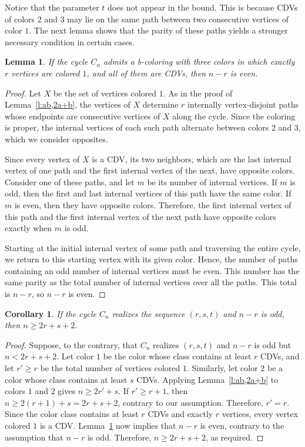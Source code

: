 \documentclass{article}
\newtheorem{corollary}[theorem]{Corollary}
\newtheorem{lemma}[theorem]{Lemma}
\theoremstyle{definition}
\begin{document}
\medskip

Notice that the parameter $t$ does not appear in the bound. This is because CDVs of colors $2$ and $3$ may lie on the same path between two consecutive vertices of color $1$. The next lemma shows that the parity of these paths yields a stronger necessary condition in certain cases.

\begin{lemma}\label{l:n-a,even}
If the cycle $C_n$ admits a b-coloring with three colors in which exactly $r$ vertices are colored $1$, and all of them are CDVs, then $n-r$ is even.
\end{lemma}

\begin{proof}
Let $X$ be the set of vertices colored $1$. As in the proof of Lemma~\ref{l:ab,2a+b}, the vertices of $X$ determine $r$ internally vertex-disjoint paths whose endpoints are consecutive vertices of $X$ along the cycle. Since the coloring is proper, the internal vertices of each such path alternate between colors $2$ and $3$, which we consider opposites.

Since every vertex of $X$ is a CDV, its two neighbors, which are the last internal vertex of one path and the first internal vertex of the next, have opposite colors.
Consider one of these paths, and let $m$ be its number of internal vertices. If $m$ is odd, then the first and last internal vertices of this path have the same color. If $m$ is even, then they have opposite colors.
Therefore, the first internal vertex of this path and the first internal vertex of the next path have opposite colors exactly when $m$ is odd.

Starting at the initial internal vertex of some path and traversing the entire cycle, we return to this starting vertex with its given color. Hence, the number of paths containing an odd number of internal vertices must be even.
This number has the same parity as the total number of internal vertices over all the paths.
This total is $n-r$, so $n-r$ is even.
\end{proof}

\medskip

\begin{corollary}\label{c:n-aodd,2a+b+2}
If the cycle $C_n$ realizes the sequence $(r,s,t)$ and $n-r$ is odd, then $n\ge 2r+s+2$.
\end{corollary}

\begin{proof}
Suppose, to the contrary, that $C_n$ realizes $(r,s,t)$ and $n-r$ is odd but
$n<2r+s+2$. Let color $1$ be the color whose class contains at least $r$ CDVs, and let $r'\geq r$ be the total number of vertices colored $1$. Similarly, let color $2$ be a color whose class contains at least $s$ CDVs. Applying Lemma~\ref{l:ab,2a+b} to colors $1$ and $2$ gives $n\ge 2r'+s$. If $r'\ge r+1$, then $n\ge 2(r+1)+s=2r+s+2$, contrary to our assumption. Therefore, $r'=r$. Since the color class contains at least $r$ CDVs and exactly $r$ vertices, every vertex colored $1$ is a CDV. Lemma~\ref{l:n-a,even} now implies that $n-r$ is even, contrary to the assumption that $n-r$ is odd. Therefore, $n\ge 2r+s+2$, as required.
\end{proof}
\end{document}
